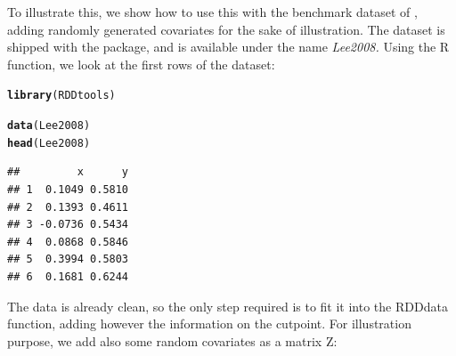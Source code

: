 \documentclass[english,nojss]{jss}\usepackage{graphicx, color}
\makeatletter
\newcommand{\hlfunctioncall}[1]{\textcolor[rgb]{0.501960784313725,0,0.329411764705882}{\textbf{#1}}}%
\newenvironment{kframe}{%
 \def\at@end@of@kframe{}%
 \ifinner\ifhmode%
  \def\at@end@of@kframe{\end{minipage}}%
  \begin{minipage}{\columnwidth}%
 \fi\fi%
 \def\FrameCommand##1{\hskip\@totalleftmargin \hskip-\fboxsep
 \colorbox{shadecolor}{##1}\hskip-\fboxsep
     \hskip-\linewidth \hskip-\@totalleftmargin \hskip\columnwidth}%
 \MakeFramed {\advance\hsize-\width
   \@totalleftmargin\z@ \linewidth\hsize
   \@setminipage}}%
 {\par\unskip\endMakeFramed%
 \at@end@of@kframe}
\newenvironment{knitrout}{}{} %
\makeatother
\begin{document}
To illustrate this, we show how to use this with the benchmark dataset
of \citet{Lee2008}, adding randomly generated covariates for the
sake of illustration. The dataset is shipped with the package, and
is available under the name \emph{Lee2008. }Using the R 
function, we look at the first rows of the dataset:

\begin{knitrout}
\color{fgcolor}\begin{kframe}
\begin{alltt}
\hlfunctioncall{library}(RDDtools)
\end{alltt}


{\ttfamily\noindent\itshape\color{messagecolor}{\#\# Loading required package: sandwich}}

{\ttfamily\noindent\itshape\color{messagecolor}{\#\# Loading required package: zoo}}

{\ttfamily\noindent\itshape\color{messagecolor}{\#\# \\\#\# Attaching package: 'zoo'}}

{\ttfamily\noindent\itshape\color{messagecolor}{\#\# The following object(s) are masked from 'package:base':\\\#\# \\\#\#\ \ \ \  as.Date, as.Date.numeric}}

{\ttfamily\noindent\itshape\color{messagecolor}{\#\# KernSmooth 2.23 loaded\\\#\# Copyright M. P. Wand 1997-2009}}

{\ttfamily\noindent\itshape\color{messagecolor}{\#\# \\\#\# RDDtools 0.1 (rev Monday 2013-05-06). PLEASE NOTE THIS is currently only a development version. \\\#\# Run vignette('RDDtools') for the documentation}}\begin{alltt}
\hlfunctioncall{data}(Lee2008)
\hlfunctioncall{head}(Lee2008)
\end{alltt}
\begin{verbatim}
##         x      y
## 1  0.1049 0.5810
## 2  0.1393 0.4611
## 3 -0.0736 0.5434
## 4  0.0868 0.5846
## 5  0.3994 0.5803
## 6  0.1681 0.6244
\end{verbatim}
\end{kframe}
\end{knitrout}


The data is already clean, so the only step required is to fit it
into the RDDdata function, adding however the information on the cutpoint.
For illustration purpose, we add also some random covariates as a
matrix Z:
\end{document}

